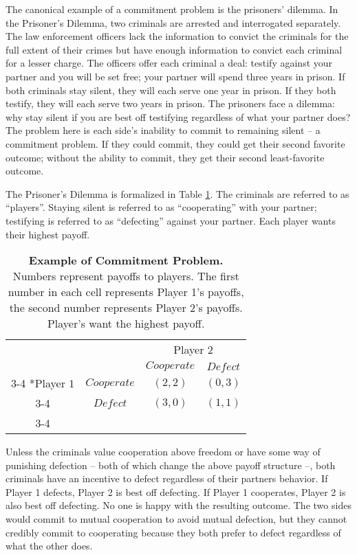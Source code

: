\documentclass[11pt]{article}
\begin{document}
The canonical example of a commitment problem is the prisoners' dilemma.
In the Prisoner's Dilemma, two criminals are arrested and interrogated
separately. The law enforcement officers lack the information to convict
the criminals for the full extent of their crimes but have enough
information to convict each criminal for a lesser charge. The officers
offer each criminal a deal: testify against your partner and you will be
set free; your partner will spend three years in prison. If both
criminals stay silent, they will each serve one year in prison. If they
both testify, they will each serve two years in prison. The prisoners
face a dilemma: why stay silent if you are best off testifying
regardless of what your partner does? The problem here is each side's
inability to commit to remaining silent -- a commitment problem. If they
could commit, they could get their second favorite outcome; without the
ability to commit, they get their second least-favorite outcome.

The Prisoner's Dilemma is formalized in Table \ref{tab:comProb}. The
criminals are referred to as ``players''. Staying silent is referred to
as ``cooperating'' with your partner; testifying is referred to as
``defecting'' against your partner. Each player wants their highest
payoff.

\begin{table}[h!]
\begin{center}
\setlength{\extrarowheight}{2pt}
\begin{tabular}{cc|c|c|}
    & \multicolumn{1}{c}{} & \multicolumn{2}{c}{Player $2$}\\
    & \multicolumn{1}{c}{} & \multicolumn{1}{c}{$Cooperate$}  & \multicolumn{1}{c}{$Defect$} \\\cline{3-4}
    \multirow{2}*{Player $1$}  & $Cooperate$ & $(2,2)$ & $(0,3)$ \\\cline{3-4}
      & $Defect$ & $(3,0)$ & $(1,1)$ \\\cline{3-4}
\end{tabular}
\caption{\label{tab:comProb}\textbf{Example of Commitment Problem.} Numbers represent payoffs to players.  The first number in each cell represents Player 1's payoffs, the second number represents Player 2's payoffs.  Player's want the highest payoff.}
\end{center}
\end{table}

Unless the criminals value cooperation above freedom or have some way of
punishing defection -- both of which change the above payoff structure
--, both criminals have an incentive to defect regardless of their
partners behavior. If Player 1 defects, Player 2 is best off defecting.
If Player 1 cooperates, Player 2 is also best off defecting. No one is
happy with the resulting outcome. The two sides would commit to mutual
cooperation to avoid mutual defection, but they cannot credibly commit
to cooperating because they both prefer to defect regardless of what the
other does.
\end{document}

